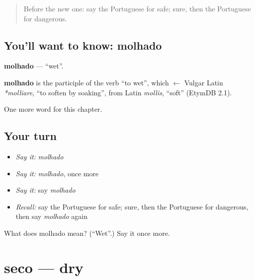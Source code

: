\label{lesson:PT-C125-molhado}



\begin{quote}
Before the new one: say the Portuguese for safe; sure, then the Portuguese for dangerous.
\end{quote}

\subsection*{You'll want to know: molhado}
\textbf{molhado} — \textquotedblleft{}wet\textquotedblright{}.

\begin{cousinweb}
\textbf{molhado} is the participle of the verb \textquotedblleft{}to wet\textquotedblright{}, which $\leftarrow$ Vulgar Latin \emph{*molliare}, \textquotedblleft{}to soften by soaking\textquotedblright{}, from Latin \emph{mollis}, \textquotedblleft{}soft\textquotedblright{} (EtymDB 2.1).
\end{cousinweb}

\begin{grammarlens}[title={What you've built}]
One more word for this chapter.
\end{grammarlens}

\subsection*{Your turn}
\begin{itemize}
\raggedright
  \item \emph{Say it:} \emph{molhado}
  \item \emph{Say it:} \emph{molhado}, once more
  \item \emph{Say it:} say \emph{molhado}
  \item \emph{Recall:} say the Portuguese for safe; sure, then the Portuguese for dangerous, then say \emph{molhado} again
\end{itemize}

\begin{tcolorbox}[breakable,colback=teal!4,colframe=teal!35!black,title={Before you move on}]
What does molhado mean? (\textquotedblleft{}Wet\textquotedblright{}.) Say it once more.
\end{tcolorbox}
\section[seco]{seco — dry}

\label{lesson:PT-C125-seco}



